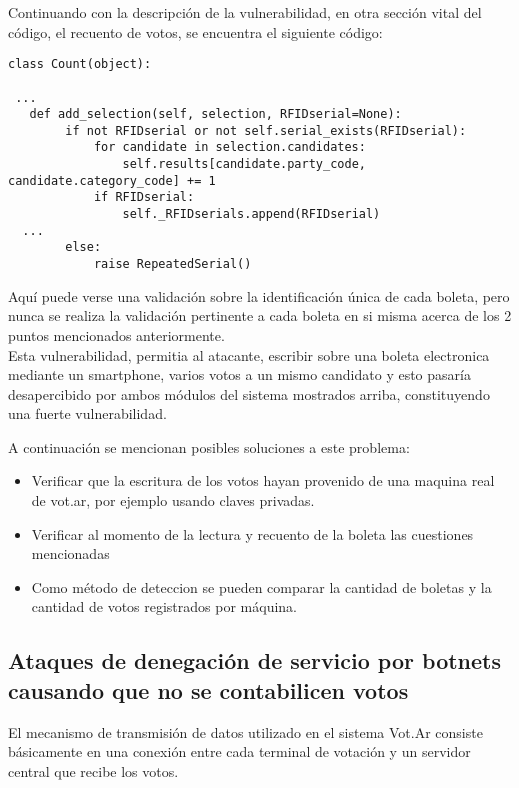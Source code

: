 Continuando con la descripción de la vulnerabilidad, en otra sección vital del código, el recuento de votos, se encuentra el siguiente código:

\begin{lstlisting}
class Count(object):

 ...
   def add_selection(self, selection, RFIDserial=None):
        if not RFIDserial or not self.serial_exists(RFIDserial):
            for candidate in selection.candidates:
                self.results[candidate.party_code, candidate.category_code] += 1
            if RFIDserial:
                self._RFIDserials.append(RFIDserial)
  ...
        else:
            raise RepeatedSerial()
\end{lstlisting}

Aquí puede verse una validación sobre la identificación única de cada boleta, pero nunca se realiza la validación pertinente a cada boleta en si misma acerca de los 2 puntos mencionados anteriormente.\\

Esta vulnerabilidad, permitia al atacante, escribir sobre una boleta electronica mediante un smartphone, varios votos a un mismo candidato y esto pasaría desapercibido por ambos módulos del sistema mostrados arriba, constituyendo una fuerte vulnerabilidad.

A continuación se mencionan posibles soluciones a este problema:

\begin{itemize}
	\item Verificar que la escritura de los votos hayan provenido de una maquina real de vot.ar, por ejemplo usando claves privadas.
	\item Verificar al momento de la lectura y recuento de la boleta las cuestiones mencionadas
	\item Como método de deteccion se pueden comparar la cantidad de boletas y la cantidad de votos registrados por máquina.
\end{itemize}


\subsection{Ataques de denegación de servicio por botnets causando que no se contabilicen votos}

El mecanismo de transmisión de datos utilizado en el sistema Vot.Ar consiste básicamente en una conexión entre cada terminal de votación y un servidor central que recibe los votos. \\

